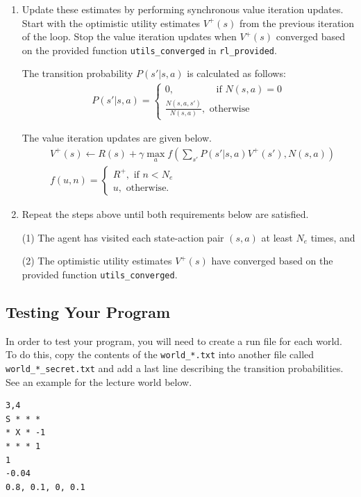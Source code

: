\documentclass[12pt]{article}
\begin{document}
\begin{enumerate}
\item 
Update these estimates by performing synchronous value iteration updates. Start with the optimistic utility estimates $V^+(s)$ from the previous iteration of the loop. Stop the value iteration updates when $V^+(s)$ converged based on the provided function \verb+utils_converged+ in \verb+rl_provided+.

The transition probability $P(s'|s, a)$ is calculated as follows:
\begin{align*}
P(s' | s, a) = 
\begin{cases}
0, \qquad\qquad \text{ if } N(s,a) = 0 \\
\displaystyle \frac{N(s,a,s')}{N(s,a)}, \text{ otherwise }
\end{cases}
\end{align*}

The value iteration updates are given below. 
\begin{align}
& V^+(s) \leftarrow R(s) + \gamma \max_{a} f \left( \sum_{s'} P(s'|s,a) V^+(s'), N(s,a) \right) \\
& f(u,n) = 
\begin{cases}
R^+, \text{ if } n < N_e \\
u, \text{ otherwise.}
\end{cases}
\end{align}


\item 
Repeat the steps above until both requirements below are satisfied. 

(1) The agent has visited each state-action pair $(s,a)$ at least $N_e$ times, and 

(2) The optimistic utility estimates $V^+(s)$ have converged based on the provided function \verb+utils_converged+.
\end{enumerate}
 
 
\newpage
\subsection{Testing Your Program}

In order to test your program, you will need to create a run file for each world. To do this, copy the contents of the \verb+world_*.txt+ into another file called \verb+world_*_secret.txt+ and add a last line describing the transition probabilities. See an example for the lecture world below.

\begin{verbatim}
3,4
S * * *
* X * -1
* * * 1
1
-0.04
0.8, 0.1, 0, 0.1
\end{verbatim}
\end{document}
